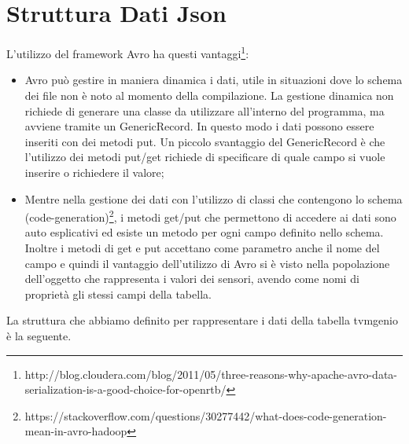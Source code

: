 \section{Struttura Dati Json}
L’utilizzo del framework Avro ha questi vantaggi\footnote{http://blog.cloudera.com/blog/2011/05/three-reasons-why-apache-avro-data-serialization-is-a-good-choice-for-openrtb/}:
\begin{itemize}
	\item Avro può gestire in maniera dinamica i dati, utile in situazioni dove lo schema dei file non è noto al momento della compilazione. La gestione dinamica non richiede di generare una classe da utilizzare all’interno del programma, ma avviene tramite un GenericRecord. In questo modo i dati possono essere inseriti con dei metodi put. Un piccolo svantaggio del GenericRecord è che l’utilizzo dei metodi put/get richiede di specificare di quale campo si vuole inserire o richiedere il valore; 
	\item Mentre nella gestione dei dati con l’utilizzo di classi che contengono lo schema (code-generation)\footnote{https://stackoverflow.com/questions/30277442/what-does-code-generation-mean-in-avro-hadoop}, i metodi get/put che permettono di accedere ai dati sono auto esplicativi ed esiste un metodo per ogni campo definito nello schema. Inoltre i metodi di get e put accettano come parametro anche il nome del campo e quindi il vantaggio dell’utilizzo di Avro si è visto nella popolazione dell’oggetto che rappresenta i valori dei sensori, avendo come nomi di proprietà gli stessi campi della tabella. 	
\end{itemize}
La struttura che abbiamo definito per rappresentare i dati della tabella tvmgenio è la seguente.
{\selectfont

}

